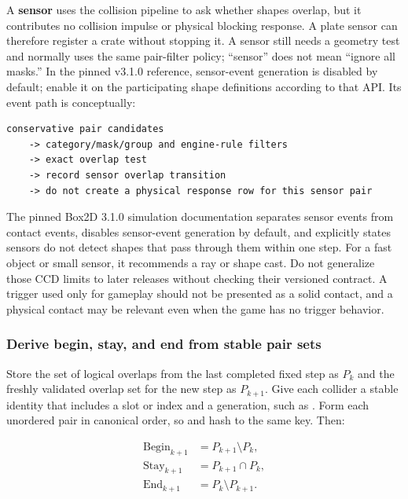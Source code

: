 \hypertarget{05-engine-i-ch017-a-sensor-detects-overlap-and-skips-physical-response}{}

A \textbf{sensor} uses the collision pipeline to ask whether shapes overlap, but it contributes no collision impulse or physical blocking response. A plate sensor can therefore register a crate without stopping it. A sensor still needs a geometry test and normally uses the same pair-filter policy; ``sensor'' does not mean ``ignore all masks.'' In the pinned v3.1.0 reference, sensor-event generation is disabled by default; enable it on the participating shape definitions according to that API. Its event path is conceptually:

\begin{verbatim}
conservative pair candidates
    -> category/mask/group and engine-rule filters
    -> exact overlap test
    -> record sensor overlap transition
    -> do not create a physical response row for this sensor pair
\end{verbatim}

The pinned Box2D 3.1.0 simulation documentation separates sensor events from contact events, disables sensor-event generation by default, and explicitly states sensors do not detect shapes that pass through them within one step. For a fast object or small sensor, it recommends a ray or shape cast. Do not generalize those CCD limits to later releases without checking their versioned contract. A trigger used only for gameplay should not be presented as a solid contact, and a physical contact may be relevant even when the game has no trigger behavior.

\subsubsection{Derive begin, stay, and end from stable pair sets}\label{05-engine-i-ch017-derive-begin-stay-and-end-from-stable-pair-sets}

\hypertarget{05-engine-i-ch017-derive-begin-stay-and-end-from-stable-pair-sets}{}

Store the set of logical overlaps from the last completed fixed step as \(P_k\) and the freshly validated overlap set for the new step as \(P_{k+1}\). Give each collider a stable identity that includes a slot or index and a generation, such as . Form each unordered pair in canonical order, so  and  hash to the same key. Then:

\[
\begin{aligned}\mathrm{Begin}_{k+1} &= P_{k+1} \setminus P_k,\\\mathrm{Stay}_{k+1} &= P_{k+1} \cap P_k,\\\mathrm{End}_{k+1} &= P_k \setminus P_{k+1}.\end{aligned}
\]

